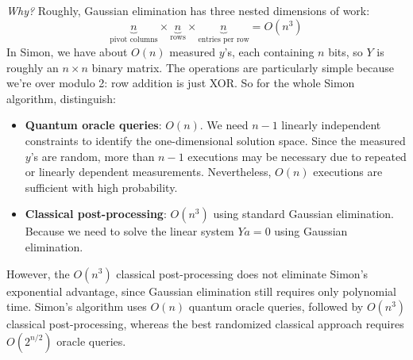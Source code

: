 \highspace
\emph{Why?} Roughly, Gaussian elimination has three nested dimensions of work:
\begin{equation*}
    \underbrace{n}_{\text{pivot columns}}
    \times
    \underbrace{n}_{\text{rows}}
    \times
    \underbrace{n}_{\text{entries per row}}
    =
    O(n^3)
\end{equation*}
In Simon, we have about $O(n)$ measured $y$'s, each containing $n$ bits, so $Y$ is roughly an $n\times n$ binary matrix. The operations are particularly simple because we're over modulo 2: row addition is just XOR. So for the whole Simon algorithm, distinguish:
\begin{itemize}
    \item \textbf{Quantum oracle queries}: $O(n)$. We need $n-1$ linearly independent constraints to identify the one-dimensional solution space. Since the measured $y$'s are random, more than $n-1$ executions may be necessary due to repeated or linearly dependent measurements. Nevertheless, $O(n)$ executions are sufficient with high probability.
    \item \textbf{Classical post-processing}: $O(n^3)$ using standard Gaussian elimination. Because we need to solve the linear system $Ya = 0$ using Gaussian elimination.
\end{itemize}
However, the $O(n^3)$ classical post-processing does not eliminate Simon's exponential advantage, since Gaussian elimination still requires only polynomial time. Simon's algorithm uses $O(n)$ quantum oracle queries, followed by $O(n^3)$ classical post-processing, whereas the best randomized classical approach requires $O(2^{n/2})$ oracle queries.

